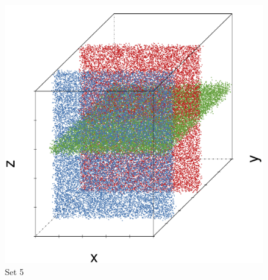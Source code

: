 \begin{subfigure}{0.18\textwidth}
	\centering
	\includegraphics[width=\textwidth]{3/img/datasetplot_ferdosi_5_60000.pdf}
	\caption{Set 5}
	\label{fig:3:simulated:datasets:ferdosi5}
\end{subfigure}	